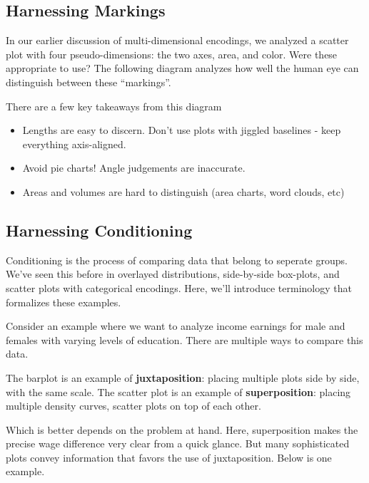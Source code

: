 \documentclass[
  letterpaper,
  DIV=11,
  numbers=noendperiod]{scrreprt}
\providecommand{\tightlist}{%
  \setlength{\itemsep}{0pt}\setlength{\parskip}{0pt}}\usepackage{longtable,booktabs,array}
\begin{document}
\hypertarget{harnessing-markings}{%
\subsection{Harnessing Markings}\label{harnessing-markings}}

In our earlier discussion of multi-dimensional encodings, we analyzed a
scatter plot with four pseudo-dimensions: the two axes, area, and color.
Were these appropriate to use? The following diagram analyzes how well
the human eye can distinguish between these ``markings''.

There are a few key takeaways from this diagram

\begin{itemize}
\tightlist
\item
  Lengths are easy to discern. Don't use plots with jiggled baselines -
  keep everything axis-aligned.
\item
  Avoid pie charts! Angle judgements are inaccurate.
\item
  Areas and volumes are hard to distinguish (area charts, word clouds,
  etc)
\end{itemize}

\hypertarget{harnessing-conditioning}{%
\subsection{Harnessing Conditioning}\label{harnessing-conditioning}}

Conditioning is the process of comparing data that belong to seperate
groups. We've seen this before in overlayed distributions, side-by-side
box-plots, and scatter plots with categorical encodings. Here, we'll
introduce terminology that formalizes these examples.

Consider an example where we want to analyze income earnings for male
and females with varying levels of education. There are multiple ways to
compare this data.

The barplot is an example of \textbf{juxtaposition}: placing multiple
plots side by side, with the same scale. The scatter plot is an example
of \textbf{superposition}: placing multiple density curves, scatter
plots on top of each other.

Which is better depends on the problem at hand. Here, superposition
makes the precise wage difference very clear from a quick glance. But
many sophisticated plots convey information that favors the use of
juxtaposition. Below is one example.
\end{document}
